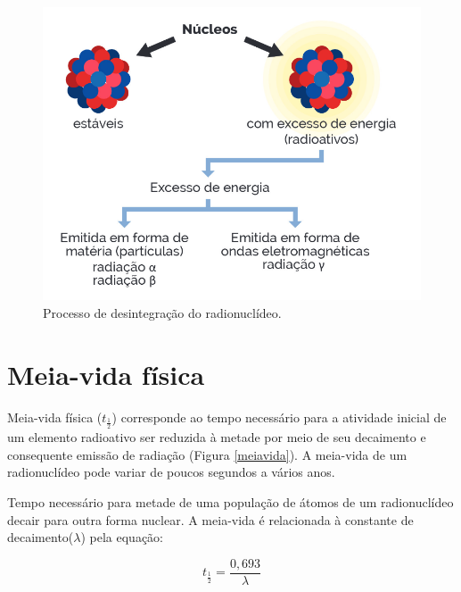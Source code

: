 \documentclass[11pt]{article}
\begin{document}
\begin{multicols}{2}
\begin{figure}[H]
\centering
\includegraphics[scale=0.22]{./../QM/nucleo.png}
\caption{\label{nucle}Processo de desintegração do radionuclídeo.}
\end{figure}


\section{Meia-vida física}
\label{sec:org8461112}

Meia-vida física (\(t_{\frac{1}{2}}\)) corresponde ao tempo necessário para a atividade inicial de um elemento radioativo ser reduzida à metade por meio de seu decaimento e consequente emissão de radiação (Figura \ref{meiavida}). A meia-vida de um radionuclídeo pode variar de poucos segundos a vários anos.


Tempo necessário para metade de uma população de átomos de um radionuclídeo decair para outra forma nuclear. A meia-vida é relacionada à constante de decaimento(\(\lambda\)) pela equação:


\begin{equation}
t_{\frac{1}{2}}= \frac{0,693}{\lambda}
\end{equation}


\end{multicols}
\end{document}
